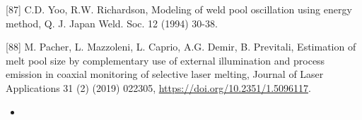 \documentclass[10pt]{article}
\begin{document}
[87] C.D. Yoo, R.W. Richardson, Modeling of weld pool oscillation using energy method, Q. J. Japan Weld. Soc. 12 (1994) 30-38.

[88] M. Pacher, L. Mazzoleni, L. Caprio, A.G. Demir, B. Previtali, Estimation of melt pool size by complementary use of external illumination and process emission in coaxial monitoring of selective laser melting, Journal of Laser Applications 31 (2) (2019) 022305, \href{https://doi.org/10.2351/1.5096117}{https://doi.org/10.2351/1.5096117}.

\begin{itemize}
  \item 
\end{itemize}
\end{document}
